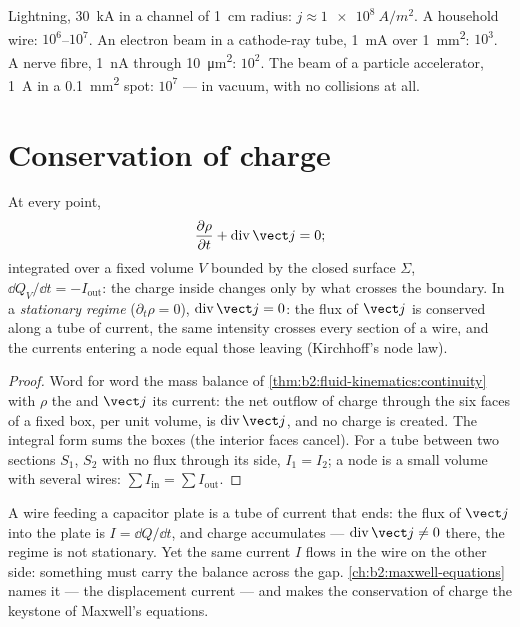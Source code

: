 \begin{example}\label{ex:b2:charges-currents-conduction:orders}
Lightning, \qty{30}{kA} in a channel of \qty{1}{cm} radius: $j \approx \qty{1e8}{A/m^2}$.
A household wire: $10^6$--$10^7$. An electron beam in a cathode-ray tube,
\qty{1}{mA} over \qty{1}{mm^2}: $10^3$. A nerve fibre, \qty{1}{nA} through
\qty{10}{\micro m^2}: $10^2$. The beam of a particle accelerator, \qty{1}{A} in a
\qty{0.1}{mm^2} spot: $10^7$ --- in vacuum, with no collisions at all.
\end{example}

\section{Conservation of charge}

\begin{theorem}\label{thm:b2:charges-currents-conduction:conservation}
At every point,
\[
\frac{\partial\rho}{\partial t} + \operatorname{div}\vect j = 0 ;
\]
integrated over a fixed volume $V$ bounded by the closed surface $\Sigma$,
$\dd Q_V/\dd t = -I_{\text{out}}$: the charge inside changes only by what
crosses the boundary. In a \emph{stationary regime} ($\partial_t\rho = 0$),
$\operatorname{div}\vect j = 0$: the flux of $\vect j$ is conserved along a tube
of current, the same intensity crosses every section of a wire, and
the currents entering a node equal those leaving (Kirchhoff's node law).
\end{theorem}

\begin{proof}
Word for word the mass balance of \cref{thm:b2:fluid-kinematics:continuity}
with $\rho$ the  and $\vect j$ its current: the net outflow
of charge through the six faces of a fixed box, per unit volume, is
$\operatorname{div}\vect j$, and no charge is created. The integral form sums
the boxes (the interior faces cancel). For a tube between two sections
$S_1$, $S_2$ with no flux through its side, $I_1 = I_2$; a node is a
small volume with several wires: $\sum I_{\text{in}} = \sum I_{\text{out}}$.
\end{proof}

\begin{remark}\label{rem:b2:charges-currents-conduction:capacitor}
A wire feeding a capacitor plate is a tube of current that ends: the
flux of $\vect j$ into the plate is $I = \dd Q/\dd t$, and charge accumulates
--- $\operatorname{div}\vect j \ne 0$ there, the regime is not stationary.
Yet the same current $I$ flows in the wire on the other side: something
must carry the balance across the gap. \cref{ch:b2:maxwell-equations}
names it --- the displacement current --- and makes the conservation of
charge the keystone of Maxwell's equations.
\end{remark}

